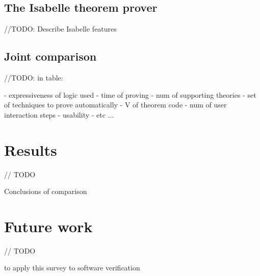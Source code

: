 \documentclass[article]{aaltoseries}
\begin{document}
\subsection{The Isabelle theorem prover}
\label{sec:prover_isabelle}

//TODO: Describe Isabelle features


\subsection{Joint comparison}
\label{sec:joint_comparison}

//TODO: in table:

- expressiveness of logic used
- time of proving
- num of supporting theories
- set of techniques to prove automatically
- V of theorem code
- num of user interaction steps
- usability
- etc ...



\section{Results}
\label{sec:results}
// TODO

Conclusions of comparison


\section{Future work}
\label{sec:future_work}
// TODO

to apply this survey to software verification






\end{document}
